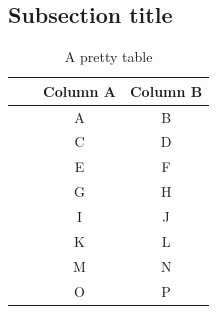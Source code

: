 \documentclass[compress]{beamer}
\begin{document}
\subsection{Subsection title}
\begin{frame}

\begin{scriptsize}
\begin{table}[htp!]
\caption{A pretty table}
    \centering
\begin{tabular}{l | m{7mm} | c c }
\hline
&  & \textbf{Column A} & \textbf{Column B} \\
\hline
\parbox[t]{2mm}{} & \parbox[t]{2mm}{  } & A & B \\[1mm]
&  & C     & D \\[1mm]
&  \parbox[t]{2mm}{}  & E & F \\[1mm]
& & G 		 & H \\[1mm]
\hline
\parbox[t]{2mm}{} & \parbox[t]{2mm}{  } & I & J \\[1mm] 
&  & K     & L \\[1mm]
&  \parbox[t]{2mm}{}  & M & N  \\[1mm]
& & O 		 &  P  \\[1mm]
\hline
\end{tabular}
\label{tab:estimates}
\end{table}
\end{scriptsize}


\end{frame}


\section*{}
\end{document}
